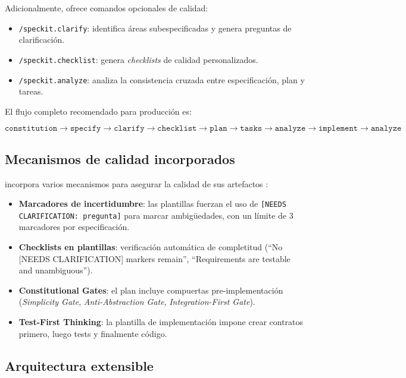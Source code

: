 Adicionalmente, \speckit{} ofrece comandos opcionales de calidad:

\begin{itemize}
    \item \texttt{/speckit.clarify}: identifica \'areas subespecificadas y genera preguntas de clarificaci\'on.
    \item \texttt{/speckit.checklist}: genera \emph{checklists} de calidad personalizados.
    \item \texttt{/speckit.analyze}: analiza la consistencia cruzada entre especificaci\'on, plan y tareas.
\end{itemize}

El flujo completo recomendado para producci\'on \cite{speckit_docs} es:

\[
\texttt{constitution} \rightarrow \texttt{specify} \rightarrow \texttt{clarify} \rightarrow \texttt{checklist} \rightarrow \texttt{plan} \rightarrow \texttt{tasks} \rightarrow \texttt{analyze} \rightarrow \texttt{implement} \rightarrow \texttt{analyze}
\]

\subsection{Mecanismos de calidad incorporados}

\speckit{} incorpora varios mecanismos para asegurar la calidad de sus artefactos \cite{speckit_sdd}:

\begin{itemize}
    \item \textbf{Marcadores de incertidumbre}: las plantillas fuerzan el uso de \texttt{[NEEDS CLARIFICATION: pregunta]} para marcar ambig\"uedades, con un l\'imite de 3 marcadores por especificaci\'on.
    \item \textbf{Checklists en plantillas}: verificaci\'on autom\'atica de completitud (``No [NEEDS CLARIFICATION] markers remain'', ``Requirements are testable and unambiguous'').
    \item \textbf{Constitutional Gates}: el plan incluye compuertas pre-implementaci\'on (\emph{Simplicity Gate}, \emph{Anti-Abstraction Gate}, \emph{Integration-First Gate}).
    \item \textbf{Test-First Thinking}: la plantilla de implementaci\'on impone crear contratos primero, luego tests y finalmente c\'odigo.
\end{itemize}

\subsection{Arquitectura extensible}

